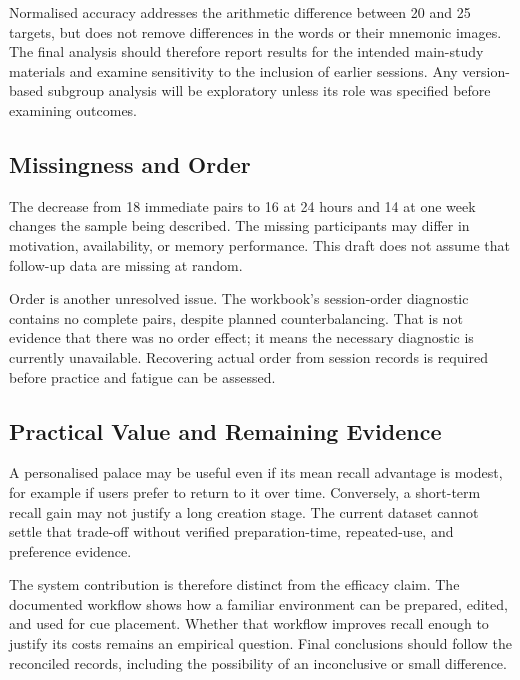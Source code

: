 Normalised accuracy addresses the arithmetic difference between 20 and 25 targets, but does not remove differences in the words or their mnemonic images. The final analysis should therefore report results for the intended main-study materials and examine sensitivity to the inclusion of earlier sessions. Any version-based subgroup analysis will be exploratory unless its role was specified before examining outcomes.

\subsection{Missingness and Order}
The decrease from 18 immediate pairs to 16 at 24 hours and 14 at one week changes the sample being described. The missing participants may differ in motivation, availability, or memory performance. This draft does not assume that follow-up data are missing at random.

Order is another unresolved issue. The workbook's session-order diagnostic contains no complete pairs, despite planned counterbalancing. That is not evidence that there was no order effect; it means the necessary diagnostic is currently unavailable. Recovering actual order from session records is required before practice and fatigue can be assessed.

\subsection{Practical Value and Remaining Evidence}
A personalised palace may be useful even if its mean recall advantage is modest, for example if users prefer to return to it over time. Conversely, a short-term recall gain may not justify a long creation stage. The current dataset cannot settle that trade-off without verified preparation-time, repeated-use, and preference evidence.

The system contribution is therefore distinct from the efficacy claim. The documented workflow shows how a familiar environment can be prepared, edited, and used for cue placement. Whether that workflow improves recall enough to justify its costs remains an empirical question. Final conclusions should follow the reconciled records, including the possibility of an inconclusive or small difference.

